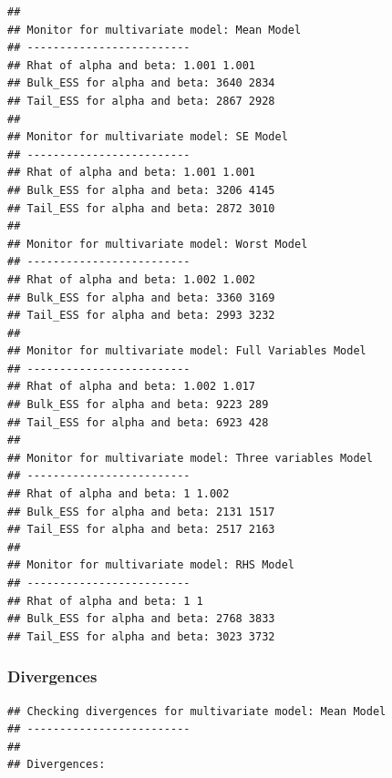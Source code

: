 \documentclass[
]{article}
\newenvironment{Shaded}{\begin{snugshade}}{\end{snugshade}}
\newcommand{\CharTok}[1]{\textcolor[rgb]{0.31,0.60,0.02}{#1}}
\newcommand{\ControlFlowTok}[1]{\textcolor[rgb]{0.13,0.29,0.53}{\textbf{#1}}}
\newcommand{\DecValTok}[1]{\textcolor[rgb]{0.00,0.00,0.81}{#1}}
\newcommand{\KeywordTok}[1]{\textcolor[rgb]{0.13,0.29,0.53}{\textbf{#1}}}
\newcommand{\NormalTok}[1]{#1}
\newcommand{\OperatorTok}[1]{\textcolor[rgb]{0.81,0.36,0.00}{\textbf{#1}}}
\newcommand{\StringTok}[1]{\textcolor[rgb]{0.31,0.60,0.02}{#1}}
\begin{document}
\begin{verbatim}
## 
## Monitor for multivariate model: Mean Model 
## -------------------------
## Rhat of alpha and beta: 1.001 1.001 
## Bulk_ESS for alpha and beta: 3640 2834 
## Tail_ESS for alpha and beta: 2867 2928 
## 
## Monitor for multivariate model: SE Model 
## -------------------------
## Rhat of alpha and beta: 1.001 1.001 
## Bulk_ESS for alpha and beta: 3206 4145 
## Tail_ESS for alpha and beta: 2872 3010 
## 
## Monitor for multivariate model: Worst Model 
## -------------------------
## Rhat of alpha and beta: 1.002 1.002 
## Bulk_ESS for alpha and beta: 3360 3169 
## Tail_ESS for alpha and beta: 2993 3232 
## 
## Monitor for multivariate model: Full Variables Model 
## -------------------------
## Rhat of alpha and beta: 1.002 1.017 
## Bulk_ESS for alpha and beta: 9223 289 
## Tail_ESS for alpha and beta: 6923 428 
## 
## Monitor for multivariate model: Three variables Model 
## -------------------------
## Rhat of alpha and beta: 1 1.002 
## Bulk_ESS for alpha and beta: 2131 1517 
## Tail_ESS for alpha and beta: 2517 2163 
## 
## Monitor for multivariate model: RHS Model 
## -------------------------
## Rhat of alpha and beta: 1 1 
## Bulk_ESS for alpha and beta: 2768 3833 
## Tail_ESS for alpha and beta: 3023 3732
\end{verbatim}

\hypertarget{divergences-1}{%
\subsubsection{Divergences}\label{divergences-1}}

\begin{Shaded}
\end{Shaded}

\begin{verbatim}
## Checking divergences for multivariate model: Mean Model 
## -------------------------
## 
## Divergences:
\end{verbatim}
\end{document}
